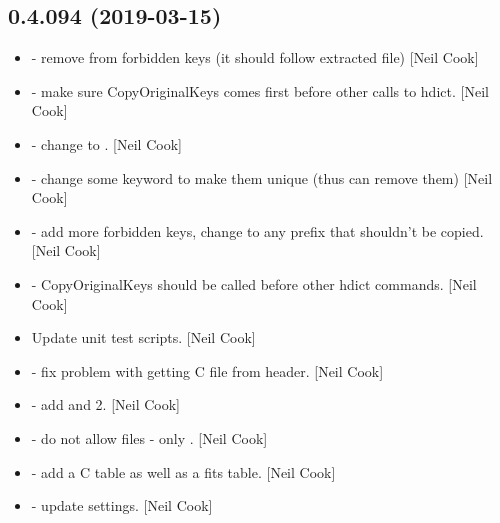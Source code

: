\documentclass[a4paper,10pt,english]{report}
\begin{document}
\subsection{0.4.094 (2019-03-15)}
\label{\detokenize{misc/changelog:id165}}\begin{itemize}
\item {} 
 - remove  from forbidden keys (it should follow
extracted file) {[}Neil Cook{]}

\item {} 
 - make sure CopyOriginalKeys comes first before other
calls to hdict. {[}Neil Cook{]}

\item {} 
 - change  to .
{[}Neil Cook{]}

\item {} 
 - change some keyword to make them unique (thus can
remove them) {[}Neil Cook{]}

\item {} 
 - add more forbidden keys, change  to any prefix
that shouldn’t be copied. {[}Neil Cook{]}

\item {} 
 - CopyOriginalKeys should be called before other
hdict commands. {[}Neil Cook{]}

\item {} 
Update unit test scripts. {[}Neil Cook{]}

\item {} 
 - fix problem with getting C file from header. {[}Neil Cook{]}

\item {} 
 - add  and 2. {[}Neil Cook{]}

\item {} 
 - do not allow  files - only . {[}Neil
Cook{]}

\item {} 
 - add a C table as well as a fits table.
{[}Neil Cook{]}

\item {} 
 - update settings. {[}Neil Cook{]}


\end{itemize}
\end{document}

